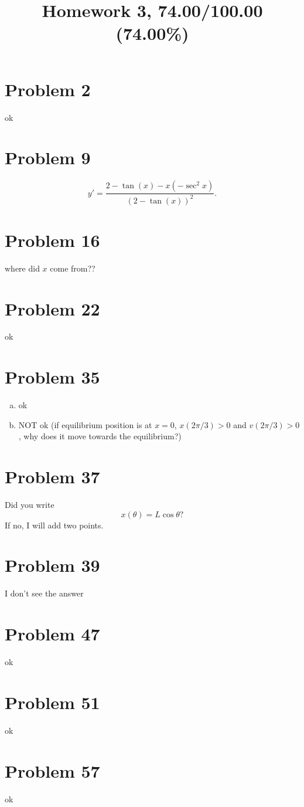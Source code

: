\documentclass[10pt]{article} %
\title{Homework 3,
74.00/100.00 (74.00\%)
}
\begin{document}
\maketitle

\section*{Problem 2 }
ok
\section*{Problem 9 }
\begin{equation*}
  y'=\frac{2-\tan(x)-x(-\sec^2x)}{(2-\tan(x))^2}.
\end{equation*}
\section*{Problem 16 }
where did $x$ come from??
\section*{Problem 22 }
ok
\section*{Problem 35 }
\begin{enumerate}[(a)]
  \item ok
  \item NOT ok (if equilibrium position is at $x=0$, $x(2\pi/3)>0$ and $v(2\pi/3)>0$, why does it move
    towards the equilibrium?)
\end{enumerate}
\section*{Problem 37 }
Did you write \begin{equation*}
  x(\theta)=L\cos\theta?
\end{equation*}
If no, I will add two points.
\section*{Problem 39 }
I don't see the answer
\section*{Problem 47 }
ok
\section*{Problem 51 }
ok
\section*{Problem 57 }
ok
\end{document}
